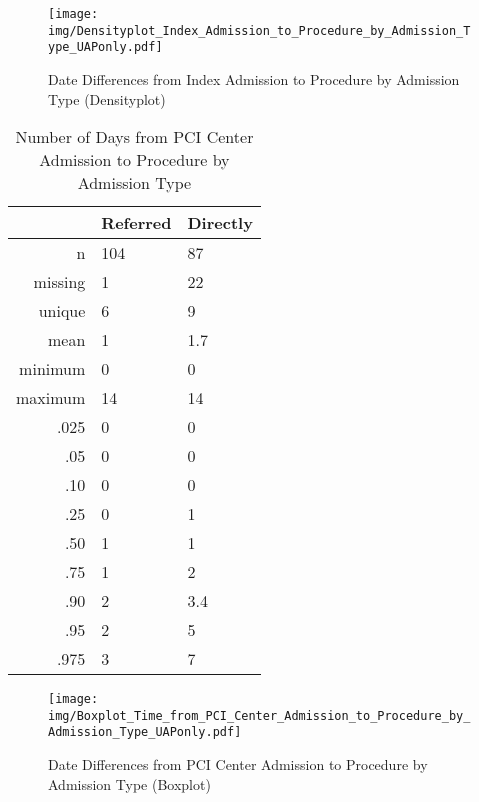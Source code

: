 \documentclass[presentation,xcolor=pdftex,dvipsnames,table,11pt]{beamer}
\begin{document}
\begin{tiny}
\begin{frame}
\begin{figure}
  \centering
  \caption{Date Differences from Index Admission to Procedure by Admission Type (Densityplot)}
  \label{Density: Date Differences from Index Admission to Procedure by Admission Type}
\texttt{[image: img/Densityplot\_Index\_Admission\_to\_Procedure\_by\_Admission\_Type\_UAPonly.pdf]}\end{figure}
\end{frame}





\begin{table}[ht]
\centering
\begin{tabular}{rll}
  \toprule
 & Referred & Directly \\ 
  \midrule
n & 104 & 87 \\ 
  missing & 1 & 22 \\ 
  unique & 6 & 9 \\ 
  mean & 1 & 1.7 \\ 
  minimum & 0 & 0 \\ 
  maximum & 14 & 14 \\ 
  .025 & 0 & 0 \\ 
  .05 & 0 & 0 \\ 
  .10 & 0 & 0 \\ 
  .25 & 0 & 1 \\ 
  .50 & 1 & 1 \\ 
  .75 & 1 & 2 \\ 
  .90 & 2 & 3.4 \\ 
  .95 & 2 & 5 \\ 
  .975 & 3 & 7 \\ 
   \bottomrule
\end{tabular}
\caption{Number of Days from PCI Center Admission to Procedure by Admission Type} 
\end{table}
\begin{frame}
\begin{figure}
  \centering
  \caption{Date Differences from PCI Center Admission to Procedure by Admission Type (Boxplot)}
  \label{Boxplot: Date Differences from PCI Center Admission to Procedure by Admission Type}
\texttt{[image: img/Boxplot\_Time\_from\_PCI\_Center\_Admission\_to\_Procedure\_by\_Admission\_Type\_UAPonly.pdf]}\end{figure}
\end{frame}



\end{tiny}
\end{document}
